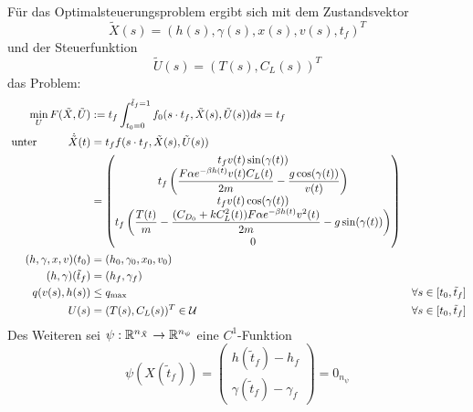 \begin{problem}\label{prob:MaxRFEndzeit}
Für das Optimalsteuerungsproblem ergibt sich mit dem Zustandsvektor
\[\tilde{X}(s) = (h(s),\gamma(s),x(s),v(s),t_f)^T\]
und der Steuerfunktion
\[\tilde{U}(s) = (T(s),C_L(s))^T\]
das Problem:
\begin{align*}
\min_{U} F(\tilde{X},\tilde{U}) &:= t_f \int^{\tilde{t}_f = 1}_{t_0 = 0} f_0(s \cdot t_f,\tilde{X}(s),\tilde{U}(s)) ds = t_f & & \\\
\text{unter} \hspace{10mm} \dot{\tilde{X}}(t) &= t_f f(s \cdot t_f,\tilde{X}(s),\tilde{U}(s))\\\
&= \begin{pmatrix}
t_f v(t) \sin(\gamma(t)) \\ 
t_f \left( \dfrac{F \alpha e^{-\beta h(t)} v(t) C_L(t)}{2m} - \dfrac{g \cos(\gamma(t))}{v(t)} \right) \\ 
t_f v(t) \cos(\gamma(t)) \\ 
t_f \left( \dfrac{T(t)}{m} - \dfrac{(C_{D_0} + k C_L^2(t)) F \alpha e^{-\beta h(t)} v^2(t)}{2m} - g \sin(\gamma(t)) \right) \\
0
\end{pmatrix} & & \\\
(h,\gamma,x,v)(t_0) &= (h_0,\gamma_0,x_0,v_0) & & \\\
(h,\gamma)(\tilde{t}_f) &= (h_f,\gamma_f) & & \\\
q(v(s),h(s)) &\leq q_{\max} & & \forall s \in [t_0,\tilde{t}_f]\\\
U(s) &= (T(s),C_L(s))^T \in \mathcal{U} & & \forall s \in [t_0,\tilde{t}_f]
\end{align*}
Des Weiteren sei $\psi : \mathbb{R}^{n_{\tilde{X}}} \to \mathbb{R}^{n_{\psi}}$ eine $C^1$-Funktion
\[\psi(X(\tilde{t}_f)) = 
\begin{pmatrix}
    h(\tilde{t}_f) - h_f \\ 
    \gamma(\tilde{t}_f) - \gamma_f
\end{pmatrix} = 0_{n_{\psi}}\]
\end{problem}











